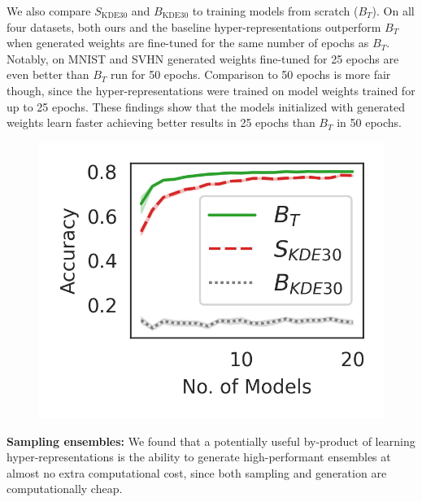 \documentclass{article}
\begin{document}
We also compare $S_{\text{KDE}30}$ and $B_{\text{KDE}30}$ to training models from scratch ($B_T$).
On all four datasets, both ours and the baseline hyper-representations outperform $B_T$ when generated weights are fine-tuned for the same number of epochs as $B_T$.
Notably, on MNIST and SVHN generated weights fine-tuned for 25 epochs are even better than $B_T$ run for 50 epochs. Comparison to 50 epochs is more fair though, since the hyper-representations were trained on model weights trained for up to 25 epochs.
These findings show that the models initialized with generated weights learn faster achieving better results in 25 epochs than $B_T$ in 50 epochs.

\vspace{12pt}

\begin{figure}
\vspace{-2mm}
\centering
\includegraphics[trim=4mm 4.5mm 3.5mm 3.8mm, clip, width=1.0\linewidth]{figures/ensemble_sampling_comparison.png}
\vspace{-6mm}
\vspace{-4mm}
\label{fig:ensembles}    
\end{figure}
\textbf{Sampling ensembles:} We found that a potentially useful by-product of learning hyper-representations is the ability to generate high-performant ensembles at almost no extra computational cost, since both sampling and generation are computationally cheap. 
\end{document}
